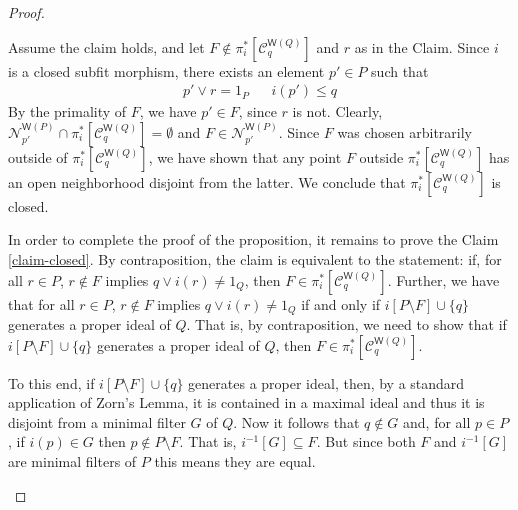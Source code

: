 \documentclass{article}
\newcommand{\opencorn}[2]{\mathcal{N}^{\mathsf{W}(#1)}_{#2}}
\newcommand{\closedcorn}[2]{\mathcal{C}^{\mathsf{W}(#1)}_{#2}}
\theoremstyle{plain}
\theoremstyle{definition}
\theoremstyle{remark}
\newcommand{\0}{\mathbbm 0}
\newcommand{\1}{\mathbbm 1}
\newcommand{\2}{\mathbbm 2}
\begin{document}
\begin{proof}
\begin{description}[font=\normalfont\itshape]
 Assume the claim holds, and let $F\not\in \pi^*_i[\closedcorn{Q}{q}]$ and $r$ as in the Claim. Since $i$ is a closed subfit morphism, there exists an element $p' \in P$ such that \begin{align*}
          p' \vee r =1_P  && i(p') \leq q
   \end{align*}
By the primality of $F$, we have $p' \in F$, since $r$ is not. Clearly,  $\opencorn{P}{p'} \cap \pi^*_i[\closedcorn{Q}{q}] = \emptyset$ and $F\in \opencorn{P}{p'}$. 
%
%
Since $F$ was chosen arbitrarily outside of $\pi^*_i[\closedcorn{Q}{q}]$, we have shown that any point $F$ outside $\pi^*_i[\closedcorn{Q}{q}]$ has an open neighborhood disjoint from the latter. We conclude that $\pi^*_i[\closedcorn{Q}{q}]$ is closed.

In order to complete the proof of the proposition, it remains to prove the Claim \ref{claim-closed}. 
By contraposition, the claim is equivalent to the statement: if, for all $r\in P$, $r\not\in F$  implies $q\vee i(r)\neq 1_Q$, then $F\in\pi_i^*[\closedcorn{Q}{q}]$. Further, we have that for all $r\in P$, $r\not\in F$ implies $q\vee i(r)\neq 1_Q$ if and only if $i[P\setminus F]\cup\{q\}$ generates a proper ideal of $Q$. That is, by contraposition, we need to show that if $i[P\setminus F]\cup\{q\}$ generates a proper ideal of $Q$, then $F\in\pi_i^*[\closedcorn{Q}{q}]$.

To this end, if $i[P\setminus F]\cup\{q\}$ generates a proper ideal, then, by a standard application of Zorn's Lemma, it is contained in a maximal ideal and thus it is disjoint from a minimal filter $G$ of $Q$. Now it follows that $q\not\in G$ and, for all $p\in P$, if $i(p)\in G$ then $p\not\in P\setminus F$. That is, $i^{-1}[G]\subseteq F$. But since both $F$ and $i^{-1}[G]$ are minimal filters of $P$ this means they are equal.


\end{description}

  \end{proof}
\end{document}
